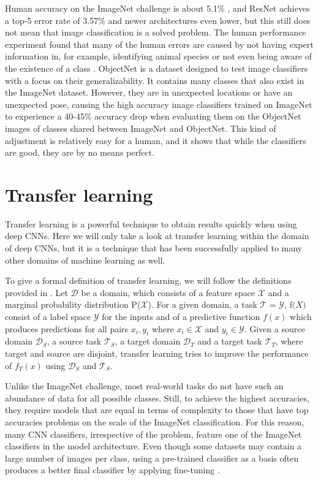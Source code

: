 Human accuracy on the ImageNet challenge is about 5.1\% \citep{imageNet_summary}, and ResNet achieves a top-5 error rate of 3.57\% \citep{resNet} and newer architectures even lower, but this still does not mean that image classification is a solved problem. The human performance experiment found that many of the human errors are caused by not having expert information in, for example, identifying animal species or not even being aware of the existence of a class \citep{imageNet_summary}. ObjectNet \citep{objectNet} is a dataset designed to test image classifiers with a focus on their generalizability. It contains many classes that also exist in the ImageNet dataset. However, they are in unexpected locations or have an unexpected pose, causing the high accuracy image classifiers trained on ImageNet to experience a 40-45\% accuracy drop when evaluating them on the ObjectNet images of classes shared between ImageNet and ObjectNet. This kind of adjustment is relatively easy for a human, and it shows that while the classifiers are good, they are by no means perfect.

\section{Transfer learning}
Transfer learning is a powerful technique to obtain results quickly when using deep CNNs. Here we will only take a look at transfer learning within the domain of deep CNNs, but it is a technique that has been successfully applied to many other domains of machine learning as well.

To give a formal definition of transfer learning, we will follow the definitions provided in \citep{transferSurvey2010}. Let $\mathcal{D}$ be a domain, which consists of a feature space $\mathcal{X}$ and a marginal probability distribution P($\mathcal{X}$). For a given domain, a task $\mathcal{T}$ = {$\mathcal{Y}$, f$\mathcal(X)$} consist of a label space $\mathcal{Y}$ for the inputs and of a predictive function $f(x)$ which produces predictions for all pairs ${x_i, y_i}$ where $x_i \in \mathcal{X}$ and $y_i \in \mathcal{Y}$. Given a source domain $\mathcal{D}_S$, a source task $\mathcal{T}_S$, a target domain $\mathcal{D}_T$ and a target task $\mathcal{T}_T$, where target and source are disjoint, transfer learning tries to improve the performance of $f_T(x)$ using $\mathcal{D}_S$ and $\mathcal{T}_S$.

Unlike the ImageNet challenge, most real-world tasks do not have such an abundance of data for all possible classes. Still, to achieve the highest accuracies, they require models that are equal in terms of complexity to those that have top accuracies problems on the scale of the ImageNet classification. For this reason, many CNN classifiers, irrespective of the problem, feature one of the ImageNet classifiers in the model architecture. Even though some datasets may contain a large number of images per class, using a pre-trained classifier as a basis often produces a better final classifier by applying fine-tuning \citep{betterTransfer}.

